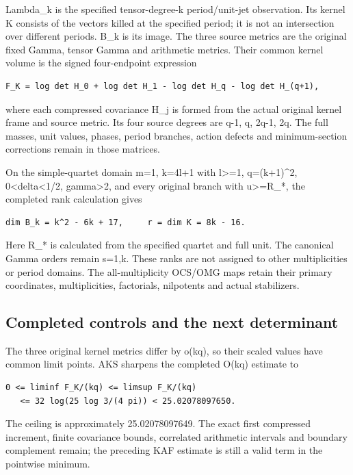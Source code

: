 \documentclass[
]{article}
\begin{document}
Lambda\_k is the specified tensor-degree-k period/unit-jet observation.
Its kernel K consists of the vectors killed at the specified period; it
is not an intersection over different periods. B\_k is its image. The
three source metrics are the original fixed Gamma, tensor Gamma and
arithmetic metrics. Their common kernel volume is the signed
four-endpoint expression

\begin{verbatim}
F_K = log det H_0 + log det H_1 - log det H_q - log det H_(q+1),
\end{verbatim}

where each compressed covariance H\_j is formed from the actual original
kernel frame and source metric. Its four source degrees are q-1, q,
2q-1, 2q. The full masses, unit values, phases, period branches, action
defects and minimum-section corrections remain in those matrices.

On the simple-quartet domain m=1, k=4l+1 with l\textgreater=1,
q=(k+1)\^{}2, 0\textless delta\textless1/2, gamma\textgreater2, and
every original branch with \textbar u\textbar\textgreater=R\_*, the
completed rank calculation gives

\begin{verbatim}
dim B_k = k^2 - 6k + 17,     r = dim K = 8k - 16.
\end{verbatim}

Here R\_* is calculated from the specified quartet and full unit. The
canonical Gamma orders remain s=1,k. These ranks are not assigned to
other multiplicities or period domains. The all-multiplicity OCS/OMG
maps retain their primary coordinates, multiplicities, factorials,
nilpotents and actual stabilizers.

\subsection{Completed controls and the next
determinant}\label{completed-controls-and-the-next-determinant}

The three original kernel metrics differ by o(kq), so their scaled
values have common limit points. AKS sharpens the completed O(kq)
estimate to

\begin{verbatim}
0 <= liminf F_K/(kq) <= limsup F_K/(kq)
   <= 32 log(25 log 3/(4 pi)) < 25.02078097650.
\end{verbatim}

The ceiling is approximately 25.02078097649. The exact first compressed
increment, finite covariance bounds, correlated arithmetic intervals and
boundary complement remain; the preceding KAF estimate is still a valid
term in the pointwise minimum.
\end{document}
